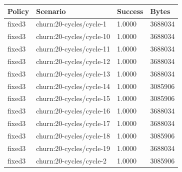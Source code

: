 \begin{tabular}{llll}
\hline
Policy & Scenario & Success & Bytes \\
\hline
fixed3 & churn:20-cycles/cycle-1 & 1.0000 & 3688034 \\
fixed3 & churn:20-cycles/cycle-10 & 1.0000 & 3688034 \\
fixed3 & churn:20-cycles/cycle-11 & 1.0000 & 3688034 \\
fixed3 & churn:20-cycles/cycle-12 & 1.0000 & 3688034 \\
fixed3 & churn:20-cycles/cycle-13 & 1.0000 & 3688034 \\
fixed3 & churn:20-cycles/cycle-14 & 1.0000 & 3085906 \\
fixed3 & churn:20-cycles/cycle-15 & 1.0000 & 3085906 \\
fixed3 & churn:20-cycles/cycle-16 & 1.0000 & 3688034 \\
fixed3 & churn:20-cycles/cycle-17 & 1.0000 & 3688034 \\
fixed3 & churn:20-cycles/cycle-18 & 1.0000 & 3085906 \\
fixed3 & churn:20-cycles/cycle-19 & 1.0000 & 3688034 \\
fixed3 & churn:20-cycles/cycle-2 & 1.0000 & 3085906 \\
\hline
\end{tabular}
